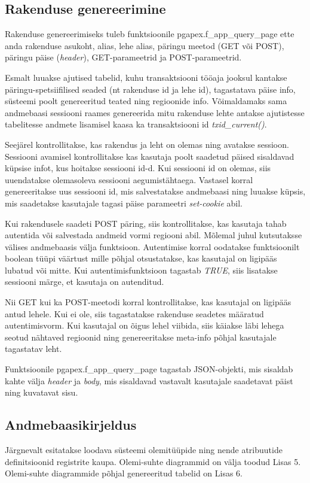 \documentclass[a4paper,12pt]{article} %
\begin{document}
\subsection{Rakenduse genereerimine}
Rakenduse genereerimiseks tuleb  funktsioonile pgapex.f\_app\_query\_page ette anda rakenduse asukoht, alias, lehe alias, päringu meetod (GET või POST), päringu päise (\textit{header}), GET-parameetrid ja POST-parameetrid.\par
Esmalt luuakse ajutised tabelid, kuhu transaktsiooni tööaja jooksul kantakse päringu-spetsiifilised seaded (nt rakenduse id ja lehe id), tagastatava päise info, süsteemi poolt genereeritud teated ning regioonide info.
Võimaldamaks sama andmebaasi sessiooni raames genereerida mitu rakenduse lehte antakse ajutistesse tabelitesse andmete lisamisel kaasa ka transaktsiooni id \textit{txid\_current()}.\par
Seejärel kontrollitakse, kas rakendus ja leht on olemas ning avatakse sessioon.
Sessiooni avamisel kontrollitakse kas kasutaja poolt saadetud päised sisaldavad küpsise infot, kus hoitakse sessiooni id-d. Kui sessiooni id on olemas, siis uuendatakse olemasoleva sessiooni aegumistähtaega. Vastasel korral genereeritakse uus sessiooni id, mis salvestatakse andmebaasi ning luuakse küpsis, mis saadetakse kasutajale tagasi päise parameetri \textit{set-cookie} abil.\par
Kui rakendusele saadeti POST päring, siis kontrollitakse, kas kasutaja tahab autentida või salvestada andmeid vormi regiooni abil. Mõlemal juhul kutsutaksse välises andmebaasis välja funktsioon. Autentimise korral oodatakse funktsioonilt boolean tüüpi väärtust mille põhjal otsustatakse, kas kasutajal on ligipääs lubatud või mitte. Kui autentimisfunktsioon tagastab \textit{TRUE}, siis lisatakse sessiooni märge, et kasutaja on autenditud.\par
Nii GET kui ka POST-meetodi korral kontrollitakse, kas kasutajal on ligipääs antud lehele. Kui ei ole, siis tagastatakse rakenduse seadetes määratud autentimisvorm. Kui kasutajal on õigus lehel viibida, siis käiakse läbi lehega seotud nähtaved regioonid ning genereeritakse meta-info põhjal kasutajale tagastatav leht.\par
Funktsioonile pgapex.f\_app\_query\_page tagastab JSON-objekti, mis sisaldab kahte välja \textit{header} ja \textit{body}, mis sisaldavad vastavalt kasutajale saadetavat päist ning kuvatavat sisu.

\subsection{Andmebaasikirjeldus}
Järgnevalt esitatakse loodava süsteemi olemitüüpide ning nende atribuutide definitsioonid registrite kaupa. Olemi-suhte diagrammid  on välja toodud Lisas 5. Olemi-suhte diagrammide põhjal genereeritud tabelid on Lisas 6.
\end{document}
